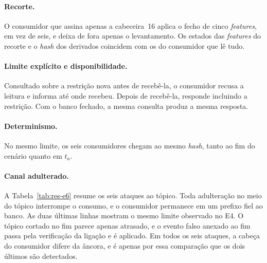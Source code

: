 \paragraph*{Recorte.} O consumidor que assina apenas a cabeceira~16 aplica o fecho de cinco \textit{features}, em vez de seis, e deixa de fora apenas o levantamento. Os estados das \textit{features} do recorte e o \textit{hash} dos derivados coincidem com os do consumidor que lê tudo.

\paragraph*{Limite explícito e disponibilidade.} Consultado sobre a restrição nova antes de recebê-la, o consumidor recusa a leitura e informa até onde recebeu. Depois de recebê-la, responde incluindo a restrição. Com o banco fechado, a mesma consulta produz a mesma resposta.

\paragraph*{Determinismo.} No mesmo limite, os seis consumidores chegam ao mesmo \textit{hash}, tanto ao fim do cenário quanto em $t_a$.

\paragraph*{Canal adulterado.} A Tabela~\ref{tab:res-e6} resume os seis ataques ao tópico. Toda adulteração no meio do tópico interrompe o consumo, e o consumidor permanece em um prefixo fiel ao banco. As duas últimas linhas mostram o mesmo limite observado no E4. O tópico cortado no fim parece apenas atrasado, e o evento falso anexado ao fim passa pela verificação da ligação e é aplicado. Em todos os seis ataques, a cabeça do consumidor difere da âncora, e é apenas por essa comparação que os dois últimos são detectados.


